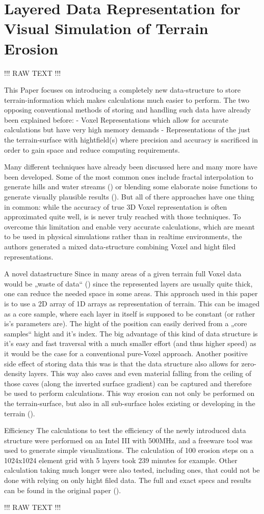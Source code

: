 \section{Layered Data Representation for Visual Simulation of Terrain Erosion}
!!! RAW TEXT !!!

This Paper focuses on introducing a completely new data-structure to store terrain-information which makes calculations much easier to perform. The two opposing conventional methods of storing and handling such data have already been explained before:
- Voxel Representations which allow for accurate calculations but have very high memory demands
- Representations of the just the terrain-surface with hightfield(s) where precision and accuracy is sacrificed in order to gain space and reduce computing requirements.

Many different techniques have already been discussed here and many more have been developed. Some of the most common ones include fractal interpolation to generate hills and water streams () or blending some elaborate noise functions to generate visually plausible results (). But all of there approaches have one thing in common: while the accuracy of true 3D Voxel representation is often approximated quite well, is is never truly reached with those techniques.
To overcome this limitation and enable very accurate calculations, which are meant to be used in physical simulations rather than in realtime environments, the authors generated a mixed data-structure combining Voxel and hight filed representations.

A novel datastructure
Since in many areas of a given terrain full Voxel data would be „waste  of data“ () since the represented layers are usually quite thick, one can reduce the needed space in some areas. This approach used in this paper is to use a 2D array of 1D arrays as representation of terrain. This can be  imaged as a core sample, where each layer in itself is supposed to be constant (or rather is’s parameters are). The hight of the position can easily derived from a „core samples“ hight and it’s index.
The big advantage of this kind of data structure is it’s easy and fast traversal with a much smaller effort (and thus higher speed) as it would be the case for a conventional pure-Voxel approach. Another positive side effect of storing data this was is that the data structure also allows for zero-density layers. This way also caves and even material falling from the ceiling of those caves (along the inverted surface gradient) can be captured and therefore be used to perform calculations. This way erosion can not only be performed on the terrain-surface, but also in all sub-surface holes existing or developing in the terrain ().

Efficiency 
The calculations to test the efficiency of the newly introduced data structure were performed on an Intel III with 500MHz, and a freeware tool was used to generate simple visualizations. The calculation of 100 erosion steps on a 1024x1024 element grid with 5 layers took 239 minutes for example. Other calculation taking much longer were also tested, including ones, that could not be done with relying on only hight filed data. The full and exact specs and results can be found in the original paper ().

!!! RAW TEXT !!!
